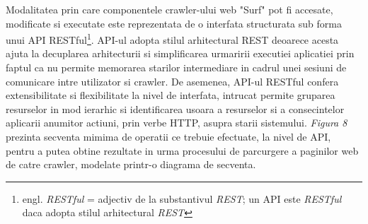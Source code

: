 Modalitatea prin care componentele crawler-ului web "Surf" pot fi accesate, modificate si executate este reprezentata de o interfata\cite{iterface-definition} structurata sub forma unui API RESTful\footnote{engl. \textit{RESTful} = adjectiv de la substantivul \textit{REST}; un API este \textit{RESTful} daca adopta stilul arhitectural \textit{REST\cite{rest-definition}}}. API-ul adopta stilul arhitectural REST\cite{rest-definition} deoarece acesta ajuta la decuplarea arhitecturii si simplificarea urmaririi executiei aplicatiei prin faptul ca nu permite memorarea starilor intermediare in cadrul unei sesiuni de comunicare intre utilizator si crawler. De asemenea, API-ul RESTful confera extensibilitate si flexibilitate la nivel de interfata, intrucat permite gruparea resurselor in mod ierarhic si identificarea usoara a resurselor si a consecintelor aplicarii anumitor actiuni, prin verbe HTTP, asupra starii sistemului. \textit{Figura 8} prezinta secventa mimima de operatii ce trebuie efectuate, la nivel de API, pentru a putea obtine rezultate in urma procesului de parcurgere a paginilor web de catre crawler, modelate printr-o diagrama de secventa.

